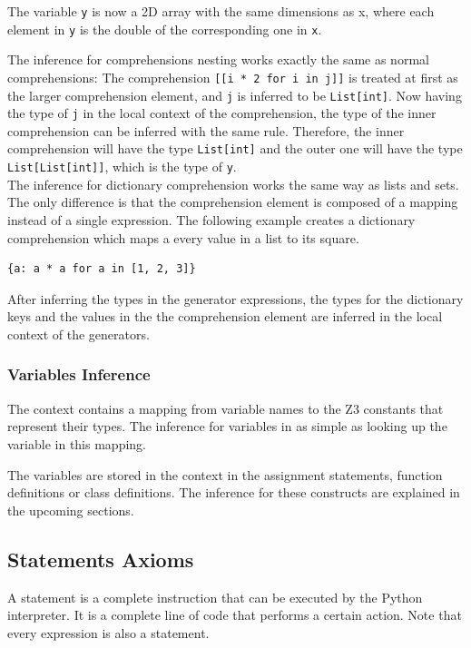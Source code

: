 The variable \lstinline|y| is now a 2D array with the same dimensions as x, where each element in \lstinline|y| is the double of the corresponding one in \lstinline|x|.

The inference for comprehensions nesting works exactly the same as normal comprehensions: The comprehension \lstinline|[[i * 2 for i in j]]| is treated at first as the larger comprehension element, and \lstinline|j| is inferred to be \lstinline|List[int]|. Now having the type of \lstinline|j| in the local context of the comprehension, the type of the inner comprehension can be inferred with the same rule. Therefore, the inner comprehension will have the type \lstinline|List[int]| and the outer one will have the type \lstinline|List[List[int]]|, which is the type of \lstinline|y|.\\

The inference for dictionary comprehension works the same way as lists and sets. The only difference is that the comprehension element is composed of a mapping instead of a single expression. The following example creates a dictionary comprehension which maps a every value in a list to its square.
\begin{lstlisting}
{a: a * a for a in [1, 2, 3]}
\end{lstlisting}

After inferring the types in the generator expressions, the types for the dictionary keys and the values in the the comprehension element are inferred in the local context of the generators.

\subsubsection{Variables Inference}
The context contains a mapping from variable names to the Z3 constants that represent their types. The inference for variables in as simple as looking up the variable in this mapping.

The variables are stored in the context in the assignment statements, function definitions or class definitions. The inference for these constructs are explained in the upcoming sections.

\subsection{Statements Axioms}
A statement is a complete instruction that can be executed by the Python interpreter. It is a complete line of code that performs a certain action. Note that every expression is also a statement.


